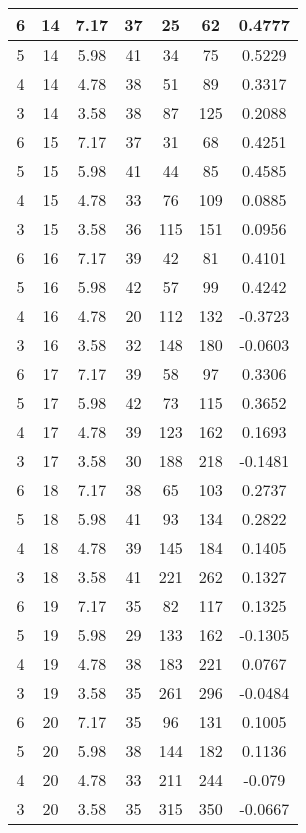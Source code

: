 \documentclass[letterpaper, 12pt]{article}
\begin{document}
\begin{longtable}{|c|c|c|c|c|c|c|}
\hline
6 & 14 & 7.17 & 37 & 25 & 62 & 0.4777 \\
\hline
5 & 14 & 5.98 & 41 & 34 & 75 & 0.5229 \\
\hline
4 & 14 & 4.78 & 38 & 51 & 89 & 0.3317 \\
\hline
3 & 14 & 3.58 & 38 & 87 & 125 & 0.2088 \\
\hline
6 & 15 & 7.17 & 37 & 31 & 68 & 0.4251 \\
\hline
5 & 15 & 5.98 & 41 & 44 & 85 & 0.4585 \\
\hline
4 & 15 & 4.78 & 33 & 76 & 109 & 0.0885 \\
\hline
3 & 15 & 3.58 & 36 & 115 & 151 & 0.0956 \\
\hline
6 & 16 & 7.17 & 39 & 42 & 81 & 0.4101 \\
\hline
5 & 16 & 5.98 & 42 & 57 & 99 & 0.4242 \\
\hline
4 & 16 & 4.78 & 20 & 112 & 132 & -0.3723 \\
\hline
3 & 16 & 3.58 & 32 & 148 & 180 & -0.0603 \\
\hline
6 & 17 & 7.17 & 39 & 58 & 97 & 0.3306 \\
\hline
5 & 17 & 5.98 & 42 & 73 & 115 & 0.3652 \\
\hline
4 & 17 & 4.78 & 39 & 123 & 162 & 0.1693 \\
\hline
3 & 17 & 3.58 & 30 & 188 & 218 & -0.1481 \\
\hline
6 & 18 & 7.17 & 38 & 65 & 103 & 0.2737 \\
\hline
5 & 18 & 5.98 & 41 & 93 & 134 & 0.2822 \\
\hline
4 & 18 & 4.78 & 39 & 145 & 184 & 0.1405 \\
\hline
3 & 18 & 3.58 & 41 & 221 & 262 & 0.1327 \\
\hline
6 & 19 & 7.17 & 35 & 82 & 117 & 0.1325 \\
\hline
5 & 19 & 5.98 & 29 & 133 & 162 & -0.1305 \\
\hline
4 & 19 & 4.78 & 38 & 183 & 221 & 0.0767 \\
\hline
3 & 19 & 3.58 & 35 & 261 & 296 & -0.0484 \\
\hline
6 & 20 & 7.17 & 35 & 96 & 131 & 0.1005 \\
\hline
5 & 20 & 5.98 & 38 & 144 & 182 & 0.1136 \\
\hline
4 & 20 & 4.78 & 33 & 211 & 244 & -0.079 \\
\hline
3 & 20 & 3.58 & 35 & 315 & 350 & -0.0667 \\
\hline
\end{longtable}
\end{document}
